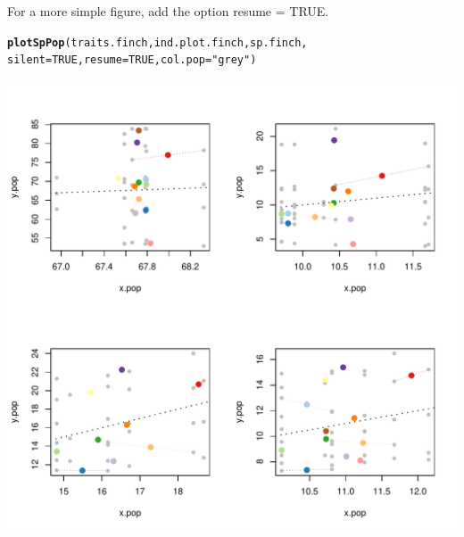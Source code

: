 \documentclass[12pt]{article}\usepackage[]{graphicx}\usepackage[]{color}
\makeatletter
\def\maxwidth{ %
  \ifdim\Gin@nat@width>\linewidth
    \linewidth
  \else
    \Gin@nat@width
  \fi
}
\newcommand{\hlnum}[1]{\textcolor[rgb]{0.686,0.059,0.569}{#1}}%
\newcommand{\hlstr}[1]{\textcolor[rgb]{0.192,0.494,0.8}{#1}}%
\newcommand{\hlstd}[1]{\textcolor[rgb]{0.345,0.345,0.345}{#1}}%
\newcommand{\hlkwc}[1]{\textcolor[rgb]{0.333,0.667,0.333}{#1}}%
\newcommand{\hlkwd}[1]{\textcolor[rgb]{0.737,0.353,0.396}{\textbf{#1}}}%
\newenvironment{kframe}{%
 \def\at@end@of@kframe{}%
 \ifinner\ifhmode%
  \def\at@end@of@kframe{\end{minipage}}%
  \begin{minipage}{\columnwidth}%
 \fi\fi%
 \def\FrameCommand##1{\hskip\@totalleftmargin \hskip-\fboxsep
 \colorbox{shadecolor}{##1}\hskip-\fboxsep
     \hskip-\linewidth \hskip-\@totalleftmargin \hskip\columnwidth}%
 \MakeFramed {\advance\hsize-\width
   \@totalleftmargin\z@ \linewidth\hsize
   \@setminipage}}%
 {\par\unskip\endMakeFramed%
 \at@end@of@kframe}
\newenvironment{knitrout}{}{} %
\makeatother
\begin{document}
For a more simple figure, add the option resume = TRUE. 
\begin{knitrout}
\color{fgcolor}\begin{kframe}
\begin{alltt}
\hlkwd{plotSpPop}\hlstd{(traits.finch, ind.plot.finch, sp.finch,}
      \hlkwc{silent} \hlstd{=} \hlnum{TRUE}\hlstd{,} \hlkwc{resume} \hlstd{=} \hlnum{TRUE}\hlstd{,} \hlkwc{col.pop} \hlstd{=} \hlstr{"grey"}\hlstd{)}
\end{alltt}
\end{kframe}
\includegraphics[width=\maxwidth]{figure/unnamed-chunk-29-1} 

\end{knitrout}
\end{document}
